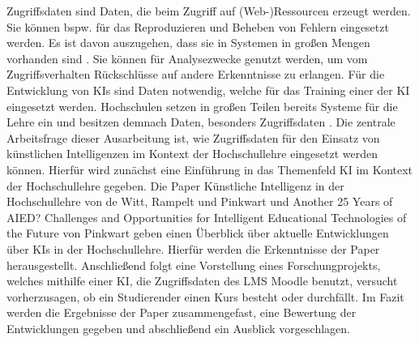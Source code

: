 \noindent
Zugriffsdaten sind Daten, die beim Zugriff auf (Web-)Ressourcen erzeugt werden.
Sie können bspw. für das Reproduzieren und Beheben von Fehlern eingesetzt werden.
Es ist davon auszugehen, dass sie in Systemen in großen Mengen vorhanden sind \cite[S. 3]{Quinn.2020}.
Sie können für Analysezwecke genutzt werden, um vom Zugriffsverhalten Rückschlüsse auf andere Erkenntnisse zu erlangen.
\noindent
Für die Entwicklung von KIs sind Daten notwendig, welche für das Training einer der KI eingesetzt werden.
Hochschulen setzen in großen Teilen bereits Systeme für die Lehre ein und besitzen demnach Daten, besonders Zugriffsdaten \cite[S. 3]{Quinn.2020}.
Die zentrale Arbeitsfrage dieser Ausarbeitung ist, wie Zugriffsdaten für den Einsatz von künstlichen Intelligenzen im Kontext der Hochschullehre eingesetzt werden können.
\noindent
Hierfür wird zunächst eine Einführung in das Themenfeld KI im Kontext der Hochschullehre gegeben.
Die Paper \glqq Künstliche Intelligenz in der Hochschullehre\grqq{} von de Witt, Rampelt und Pinkwart und \glqq Another 25 Years of AIED? Challenges and Opportunities for Intelligent Educational Technologies of the Future\grqq{} von Pinkwart geben einen Überblick über aktuelle Entwicklungen über KIs in der Hochschullehre.
Hierfür werden die Erkenntnisse der Paper herausgestellt.
Anschließend folgt eine Vorstellung eines Forschungprojekts, welches mithilfe einer KI, die Zugriffsdaten des \ac{LMS} Moodle benutzt, versucht vorherzusagen, ob ein Studierender einen Kurs besteht oder durchfällt.
Im Fazit werden die Ergebnisse der Paper zusammengefast, eine Bewertung der Entwicklungen gegeben und abschließend ein Ausblick vorgeschlagen.